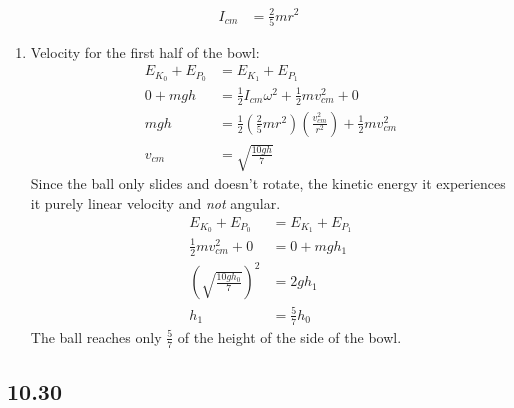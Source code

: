 \documentclass{article}
\begin{document}
\begin{align*}
	I_{cm} & = \frac{2}{5}mr^2
\end{align*}
\begin{enumerate}[label = \boldalpha]
	\item
		Velocity for the first half of the bowl:
		\begin{align*}
			E_{K_0} + E_{P_0} & = E_{K_1} + E_{P_1} \\
			0 + mgh & = \frac{1}{2}I_{cm}\omega^2 + \frac{1}{2}mv_{cm}^2 + 0 \\
			mgh & = \frac{1}{2} \left( \frac{2}{5}mr^2 \right) \left( \frac{v_{cm}^2}{r^2} \right) + \frac{1}{2}mv_{cm}^2 \\
			v_{cm} & = \sqrt{ \frac{10gh}{7} }
		\end{align*}
		Since the ball only slides and doesn't rotate, the kinetic energy it experiences it purely linear velocity and \textit{not} angular.
		\begin{align*}
			E_{K_0} + E_{P_0} & = E_{K_1} + E_{P_1} \\
			\frac{1}{2}mv_{cm}^2 + 0 & = 0 + mgh_1 \\
			\left( \sqrt{ \frac{10gh_0}{7} } \right)^2 & = 2gh_1 \\
			h_1 & = \frac{5}{7}h_0
		\end{align*}
		The ball reaches only $ \frac{5}{7} $ of the height of the side of the bowl.
\end{enumerate}

\subsection{10.30}
\end{document}
